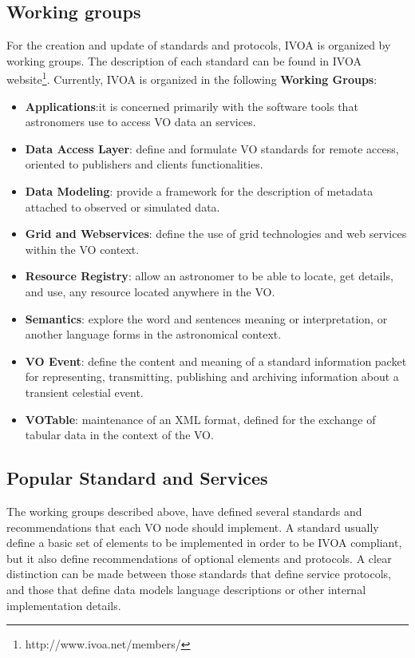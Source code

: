\subsection{Working groups}

For the creation and update of standards and protocols, IVOA is organized
by working groups. The description of each standard can be
found in IVOA website\footnote{http://www.ivoa.net/members/}. 
Currently, IVOA is organized in the following \textbf{Working Groups}:
\begin{itemize}
\item \textbf{Applications}:it is concerned primarily with the software
	tools that astronomers use to access VO data an services.
\item \textbf{Data Access Layer}: define and formulate VO standards for
	remote access, oriented to publishers and clients functionalities.
\item \textbf{Data Modeling}: provide a framework for the description
	of metadata attached to observed or simulated data.
\item \textbf{Grid and Webservices}: define the use of grid technologies
	and web services within the VO context.
\item \textbf{Resource Registry}: allow an astronomer to be
	able to locate, get details, and use, any resource located 
	anywhere in the VO.
\item \textbf{Semantics}: explore the word  and sentences
	meaning or interpretation, or another language forms in the
	astronomical context.
\item \textbf{VO Event}: define the content and meaning of a
	standard information packet for representing, transmitting, 
	publishing and archiving information about a transient celestial event.
\item \textbf{VOTable}: maintenance of an XML format, defined
	for the exchange of tabular data in the context of the VO.
\end{itemize}


\subsection{Popular Standard and Services}
\label{sec:popservices}

The working groups described above, have defined several standards
and recommendations that each VO node should implement. A standard usually 
define a basic set of elements to be implemented in order
to be IVOA compliant, but it also define recommendations of optional
elements and protocols. A clear distinction can be made between those
standards that define service protocols, and those that define data models
language descriptions or other internal implementation details.

